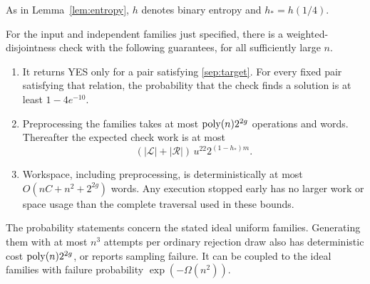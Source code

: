 As in Lemma~\ref{lem:entropy}, $h$ denotes binary entropy and
$h_*=h(1/4)$.

\begin{lemma}\label{lem:separator}
For the input and independent families just specified, there is a
weighted-disjointness check with the following guarantees, for all
sufficiently large $n$.
\begin{enumerate}
\item It returns YES only for a pair satisfying
\eqref{sep:target}. For every fixed pair satisfying that relation,
the probability that the check finds a solution is at least
$1-4e^{-10}$.
\item Preprocessing the families takes at most
$\operatorname{poly}(n)2^{2g}$ operations and words. Thereafter the expected check
work is at most
\[
 (|\mathcal L|+|\mathcal R|)\,u^{22}2^{(1-h_*)m}.
\]
\item Workspace, including preprocessing, is deterministically at most
$O(nC+n^2+2^{2g})$ words. Any execution stopped early has no
larger work or space usage than the complete traversal used in these
bounds.
\end{enumerate}
The probability statements concern the stated ideal uniform families.
Generating them with at most $n^3$ attempts per ordinary rejection
draw also has deterministic cost $\operatorname{poly}(n)2^{2g}$, or reports sampling
failure. It can be coupled to the ideal families with failure
probability $\exp(-\Omega(n^2))$.
\end{lemma}

